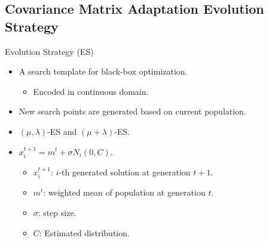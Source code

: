 \subsection{Covariance Matrix Adaptation Evolution Strategy}


\begin{frame}{Evolution Strategy (ES)}
  \begin{itemize}
    \item A search template for black-box optimization.
      \begin{itemize}
        \item Encoded in continuous domain.
      \end{itemize}
      \vspace*{14pt}
    \item New search points are generated based on current population.
      \vspace*{14pt}
    \item $(\mu,\lambda)$-ES and $(\mu+\lambda)$-ES.
      \vspace*{14pt}
    \item $x_i^{t+1} = m^t + \sigma N_i(0,C)$.
      \begin{itemize}
        \item $x_i^{t+1}$: $i$-th generated solution at generation $t+1$.
        \item $m^t$: weighted mean of population at generation $t$.
        \item $\sigma$: step size.
        \item $C$: Estimated distribution.
      \end{itemize}
  \end{itemize}
\end{frame}


